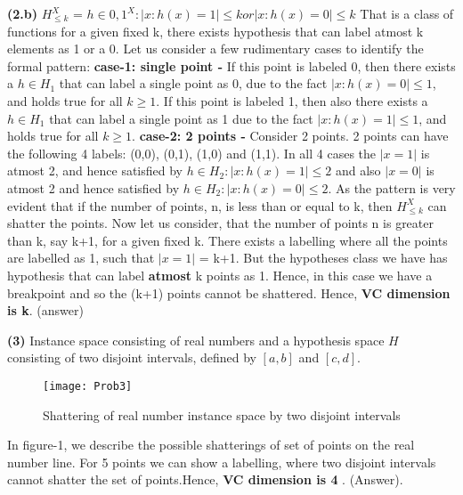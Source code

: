 \documentclass{article}
\renewcommand\part[1]{\vspace{.10in}\textbf{(#1)}}
\begin{document}
    \part{2.b}
    $H_{\leq k}^X$ = ${ h \in {0,1}^X : |{x:h(x)=1}| \leq k or |{x:h(x)=0}| \leq k}$ \newline
    That is a class of functions for a given fixed k, there exists hypothesis that can label atmost k elements as 1 or a 0. Let us consider a few rudimentary cases to identify the formal pattern: \newline
    \textbf {case-1: single point - }  If this point is labeled 0, then there exists a $h \in H_{1}$ that can label a single point as 0, due to the fact $|{x:h(x)=0}| \leq 1$, and holds true for all $k \geq 1$. \newline
    If this point is labeled 1, then also there exists a $h \in H_{1}$ that can label a single point as 1 due to the fact $|{x:h(x)=1}| \leq 1$, and holds true for all $k \geq 1$. \newline
    \textbf {case-2: 2 points - } Consider 2 points. 2 points can have the following 4 labels: (0,0), (0,1), (1,0) and (1,1). In all 4 cases the $|x=1|$ is atmost 2, and hence satisfied by $h \in H_{2}:|x:h(x)=1| \leq 2$ and also $|x=0|$ is atmost 2 and hence satisfied by $h \in H_{2}:|x:h(x)=0| \leq 2$. \newline
    As the pattern is very evident that if the number of points, n, is less than or equal to k, then $H_{\leq k}^X$ can shatter the points.  \newline
    Now let us consider, that the number of points n is greater than k, say k+1, for a given fixed k. There exists a labelling where all the points are labelled as 1, such that $|x=1|$ = k+1. But the hypotheses class we have has hypothesis that can label \textbf {atmost} k points as 1. Hence, in this case we have a breakpoint and so the (k+1)  points cannot be shattered. \newline
    Hence, \textbf {VC dimension is k}. (answer) \newline

	\part{3} Instance space consisting of real numbers and a hypothesis space $H$ consisting of two disjoint intervals, defined by $[a,b]$ and $[c,d]$. \newline
  \begin{figure}[h!]
   \centering
  \texttt{[image: Prob3]}
  \caption{Shattering of real number instance  space by two disjoint intervals}
  \end{figure}
  In figure-1, we describe the possible shatterings of set of points on the real number line. For 5 points we can show a labelling, where two disjoint intervals cannot shatter the set of points.Hence, \textbf {VC dimension is 4} . (Answer). \newline
\end{document}
